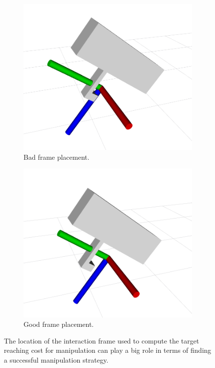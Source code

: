 \begin{figure}[t]
\centering
\begin{subfigure}{0.48\columnwidth}
    \includegraphics[width=\linewidth]{figures/panda_grasp_2.png}
    \caption{Bad frame placement.}
\end{subfigure}%
\hfill
\begin{subfigure}{0.48\columnwidth}
    \includegraphics[width=\linewidth]{figures/panda_grasp_1.png}
    \caption{Good frame placement.}
\end{subfigure}%
\hfill
\caption{The location of the interaction frame used to compute the target reaching cost for manipulation can play a big role in terms of finding a successful manipulation strategy.}\label{fig:frame_placement}
\end{figure}

